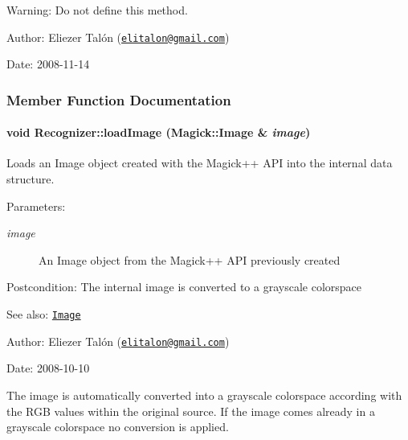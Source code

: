 \begin{Desc}
\item[Warning:]Do not define this method.\end{Desc}
\begin{Desc}
\item[Author:]Eliezer Talón (\href{mailto:elitalon@gmail.com}{\tt elitalon@gmail.com}) \end{Desc}
\begin{Desc}
\item[Date:]2008-11-14 \end{Desc}


\subsubsection{Member Function Documentation}
\hypertarget{class_recognizer_acc4244738f2577a0c344c3b3af22eb0}{
\paragraph[{loadImage}]{\setlength{\rightskip}{0pt plus 5cm}void Recognizer::loadImage (Magick::Image \& {\em image})}\hfill}
\label{class_recognizer_acc4244738f2577a0c344c3b3af22eb0}


Loads an Image object created with the Magick++ API into the internal data structure. 

\begin{Desc}
\item[Parameters:]
\begin{description}
\item[{\em image}]An Image object from the Magick++ API previously created\end{description}
\end{Desc}
\begin{Desc}
\item[Postcondition:]The internal image is converted to a grayscale colorspace\end{Desc}
\begin{Desc}
\item[See also:]\href{http://www.imagemagick.org/Magick++/Image.html}{\tt Image}\end{Desc}
\begin{Desc}
\item[Author:]Eliezer Talón (\href{mailto:elitalon@gmail.com}{\tt elitalon@gmail.com}) \end{Desc}
\begin{Desc}
\item[Date:]2008-10-10\end{Desc}
The image is automatically converted into a grayscale colorspace according with the RGB values within the original source. If the image comes already in a grayscale colorspace no conversion is applied. 

